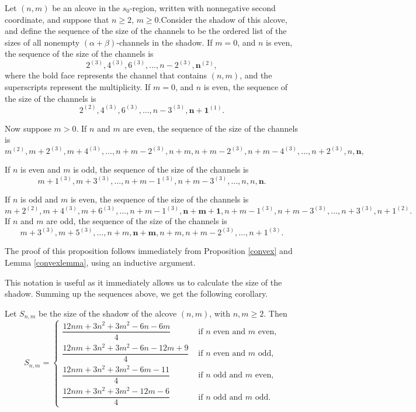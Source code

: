 \documentclass[11pt]{article}
\begin{document}
\begin{proposition}\label{numchannels}
Let $(n,m)$ be an alcove in the $s_0$-region, written with nonnegative second coordinate, and suppose that $n\geq 2$, $m\geq 0$.Consider the shadow of this alcove, and define the sequence of the size of the channels to be the ordered list of the sizes of all nonempty $(\alpha+\beta)$-channels in the shadow.
If $m=0$, and $n$ is even, the sequence of the size of the channels is
\[2^{(3)} ,4^{(3)} ,6^{(3)},\hdots,n-2^{(3)},\mathbf{n}^{(2)},\]
where the bold face represents the channel that contains $(n,m)$, and the superscripts represent the multiplicity. 
If $m=0$, and $n$ is even, the sequence of the size of the channels is
\[2^{(2)} ,4^{(3)} ,6^{(3)},\hdots,n-3^{(3)},\mathbf{n+1}^{(1)}.\]


Now suppose $m>0$. If $n$ and $m$ are even, the sequence of the size of the channels is 
    \[m^{(2)} ,m+2^{(3)} ,m+4^{(3)},\hdots, n+m-2^{(3)},n+m,n+m-2^{(3)},n+m-4^{(3)},\hdots, n+2^{(3)},n,\mathbf{n},\]
    
    If $n$ is even and $m$ is odd, the sequence of the size of the channels is
    \[m+1^{(3)},m+3^{(3)},\hdots,n+m-1^{(3)}, n+m-3^{(3)},\hdots, n,n,\mathbf{n}.\]
    

    
    If $n$ is odd and $m$ is even, the sequence of the size of the channels is 
    \[m+2^{(2)} ,m+4^{(3)} ,m+6^{(3)},\hdots, n+m-1^{(3)},\mathbf{n+m+1},n+m-1^{(3)},n+m-3^{(3)},\hdots, n+3^{(3)},n+1^{(2)}.\]
    If $n$ and $m$ are odd, the sequence of the size of the channels is
    \[m+3^{(3)},m+5^{(3)},\hdots,n+m,\mathbf{n+m},n+m, n+m-2^{(3)},\hdots, n+1^{(3)}.\]


    
\end{proposition}
The proof of this proposition follows immediately from Proposition \ref{convex} and Lemma \ref{convexlemma}, using an inductive argument. 


This notation is useful as it immediately allows us to calculate the size of the shadow. Summing up the sequences above, we get the following corollary. 


\begin{corollary}
    Let $S_{n,m}$ be the size of the shadow of the alcove $(n,m)$, with $n,m\geq 2$. Then
    \[S_{n,m}=\begin{cases}
        \dfrac{12nm+3n^2+3m^2-6n-6m}{4}& \text{ if $n$ even and $m$ even,}\\
        \dfrac{12nm+3n^2+3m^2-6n-12m+9}{4}& \text{ if $n$ even and $m$ odd,}\\
        \dfrac{12nm+3n^2+3m^2-6m-11}{4}& \text{ if $n$ odd and $m$ even,}\\
        \dfrac{12nm+3n^2+3m^2-12m-6}{4}& \text{ if $n$ odd and $m$ odd.}
            
    \end{cases}\]
\end{corollary}
\end{document}
